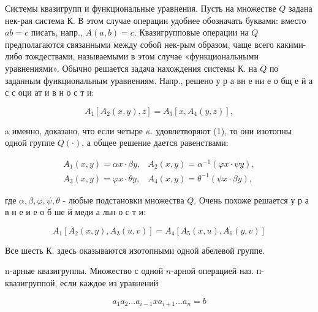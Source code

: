 \documentclass[10pt]{article}
\begin{document}
Системы квазигрупп и функциональные уравнения. Пусть на множестве $Q$ задана нек-рая система К. В этом случае операции удобнее обозначать буквами: вместо $a b=c$ писать, напр., $A(a, b)=c$. Квазигрупповые операции на $Q$ предполагаются связанными между собой нек-рым образом, чаще всего какими-либо тождествами, называемыми в этом случае «функциональными уравнениями». Обычно решается задача нахождения системы К. на $Q$ по заданным функциональным уравнениям. Напр., решено у р а вн е ни е о бщ е й а с с оци ат и в н о с т и:



\[

A_{1}\left[A_{2}(x, y), z\right]=A_{3}\left[x, A_{4}(y, z)\right],

\]



a именно, доказано, что если четыре $\kappa$. удовлетворяют (1), то они изотопны одной группе $Q(\cdot)$, а общее решение дается равенствами:



\[

\begin{array}{ll}

A_{1}(x, y)=\alpha x \cdot \beta y, & A_{2}(x, y)=\alpha^{-1}(\varphi x \cdot \psi y), \\

A_{3}(x, y)=\varphi x \cdot \theta y, & A_{4}(x, y)=\theta^{-1}(\psi x \cdot \beta y),

\end{array}

\]



где $\alpha, \beta, \varphi, \psi, \theta$ - любые подстановки множества $Q$. Очень похоже решается у р а в н е и е о б ше й меди а льн о с т и:



\[

A_{1}\left[A_{2}(x, y), A_{3}(u, v)\right]=A_{4}\left[A_{5}(x, u), A_{6}(y, v)\right]

\]



Все шесть К. здесь оказываются изотопными одной абелевой группе.



n-арные квазигруппы. Множество с одной $n$-арной операцией наз. п-квазигруппой, если каждое из уравнений



\[

a_{1} a_{2} \ldots a_{i-1} x a_{i+1} \ldots a_{n}=b

\]
\end{document}
